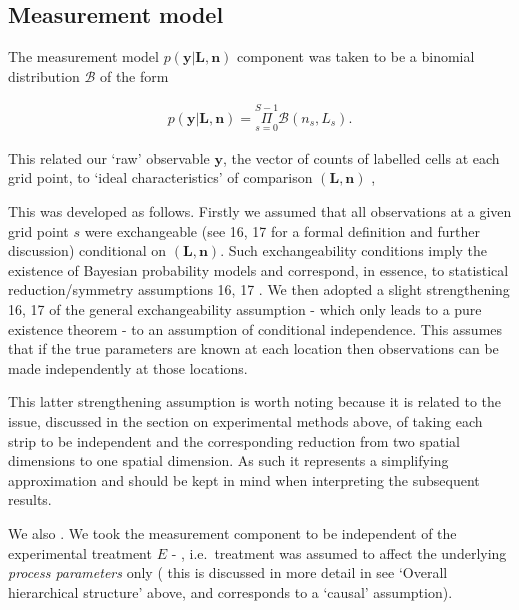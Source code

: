 \documentclass[10pt,letterpaper]{article}
\providecommand{\DIFaddtex}[1]{{\protect\color{blue} \sf #1}} %
\providecommand{\DIFdeltex}[1]{{\protect\color{red} \scriptsize #1}} %
\providecommand{\DIFaddbegin}{} %
\providecommand{\DIFaddend}{} %
\providecommand{\DIFdelbegin}{} %
\providecommand{\DIFdelend}{} %
\providecommand{\DIFadd}[1]{\texorpdfstring{\DIFaddtex{#1}}{#1}} %
\providecommand{\DIFdel}[1]{\texorpdfstring{\DIFdeltex{#1}}{}} %
\begin{document}
\DIFdelend \subsection{Measurement model}\label{measurement-model}

The measurement model \(p(\mathbf{y}|\mathbf{L},\mathbf{n})\) component
was taken to be a binomial distribution \(\mathcal{B}\) of the form

\begin{align}p(\mathbf{y}|\mathbf{L},\mathbf{n}) = \underset{s=0}{\overset{S-1}{\Pi}}\mathcal{B}(n_s,L_s).\end{align}

This related our `raw' observable \(\mathbf{y}\), the vector of counts
of labelled cells at each grid point, to `ideal characteristics' of
comparison \((\mathbf{L},\mathbf{n})\)\DIFdelbegin \DIFdel{,
}%

\DIFdel{This was developed as follows. Firstly we assumed that all observations
at a given grid point \(s\) were exchangeable (see }%
\DIFdel{16, 17}%
\DIFdel{for a
formal definition and further discussion) conditional on
\((\mathbf{L},\mathbf{n})\). Such exchangeability conditions imply the
existence of Bayesian probability models and correspond, in essence, to
statistical reduction/symmetry assumptions }%
\DIFdel{16, 17}%
\DIFdel{. We then adopted
a slight strengthening }%
\DIFdel{16, 17}%
\DIFdel{of the general exchangeability
assumption - which only leads to a pure existence theorem - to an
assumption of conditional independence. This assumes that if the true
parameters are known at each location then observations can be made
independently at those locations.
}%

\DIFdel{This latter strengthening assumption is worth noting because it is
related to the issue, discussed in the section on experimental methods
above, of taking each strip to be independent and the corresponding
reduction from two spatial dimensions to one spatial dimension. As such
it represents a simplifying approximation and should be kept in mind
when interpreting the subsequent results.
}%

\DIFdel{We also }\DIFdelend \DIFaddbegin \DIFadd{. We }\DIFaddend took the measurement
component to be independent of \DIFaddbegin \DIFadd{the experimental treatment }\DIFaddend \(E\)\DIFdelbegin \DIFdel{-
}\DIFdelend \DIFaddbegin \DIFadd{,
}\DIFaddend i.e.~treatment was assumed to affect the underlying \emph{process
parameters} only (\DIFdelbegin \DIFdel{this is discussed in more detail in }\DIFdelend \DIFaddbegin \DIFadd{see }\DIFaddend `Overall hierarchical structure' \DIFdelbegin \DIFdel{above, and corresponds to a `causal'
assumption). }%
\end{document}
